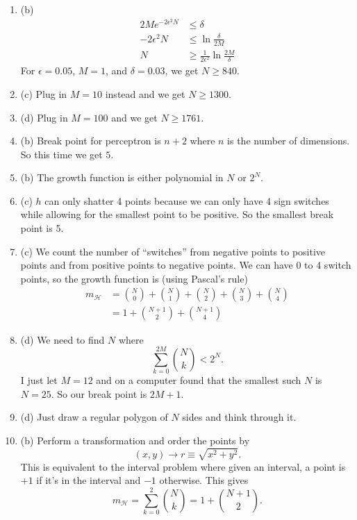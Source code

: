 \documentclass[12pt]{article}
\begin{document}
\begin{enumerate}[leftmargin=*]
\item (b)
\begin{align*}
2 M e^{- 2 \epsilon^2 N} &\leq \delta \\
- 2 \epsilon^2 N &\leq \ln \frac{\delta}{2 M} \\
N & \geq \frac{1}{2 \epsilon^2} \ln \frac{2 M}{\delta}
\end{align*}
For $\epsilon = 0.05$, $M = 1$, and $\delta = 0.03$, we get $N \geq 840$.
\item (c) Plug in $M = 10$ instead and we get $N \geq 1300$.
\item (d) Plug in $M = 100$ and we get $N \geq 1761$.
\item (b) Break point for perceptron is $n + 2$ where $n$ is the number of dimensions. So this time we get $5$.
\item (b) The growth function is either polynomial in $N$ or $2^N$.
\item (c) $h$ can only shatter 4 points because we can only have 4 sign switches while allowing for the smallest point to be positive. So the smallest break point is 5.
\item (c) We count the number of ``switches'' from negative points to positive points and from positive points to negative points. We can have 0 to 4 switch points, so the growth function is (using Pascal's rule)
\begin{align*}
m_{\mathcal H} &= \binom{N}{0} + \binom{N}{1} + \binom{N}{2} + \binom{N}{3} + \binom{N}{4} \\
&= 1 + \binom{N + 1}{2} + \binom{N + 1}{4}
\end{align*}
\item (d) We need to find $N$ where
\[ \sum_{k = 0}^{2M} \binom{N}{k} < 2^N. \]
I just let $M = 12$ and on a computer found that the smallest such $N$ is $N = 25$. So our break point is $2 M + 1$.
\item (d) Just draw a regular polygon of $N$ sides and think through it.
\item (b) Perform a transformation and order the points by
\[ (x, y) \to r \equiv \sqrt{x^2 + y^2}. \]
This is equivalent to the interval problem where given an interval, a point is $+1$ if it's in the interval and $-1$ otherwise. This gives
\[ m_{\mathcal H} = \sum_{k=0}^2 \binom{N}{k} = 1 + \binom{N + 1}{2}. \]
\end{enumerate}
\end{document}
